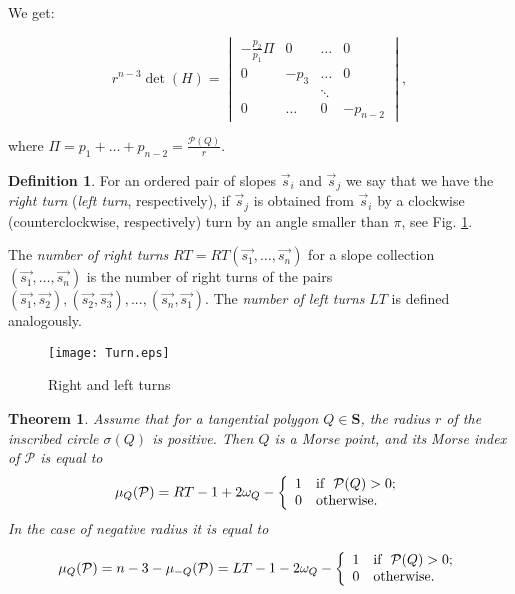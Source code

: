 \documentclass[12pt]{amsart}
\theoremstyle{plain}
\newtheorem{theorem}{Theorem}
\theoremstyle{definition}
\newtheorem{definition}{Definition}
\theoremstyle{remark}
\theoremstyle{plain}
\theoremstyle{definition}
\begin{document}
We get:

\begin{equation}\label{det}
r^{n-3}\det(H)=
\begin{vmatrix}
-\frac{p_2}{p_1}\Pi & 0 & \ldots & 0 \\
0 & -p_3 & \ldots & 0 \\
& & \ddots \\
0 & \ldots & 0 & -p_{n-2}
\end{vmatrix},
\end{equation}

where \(\Pi=p_1+\ldots+p_{n-2}=\frac{\mathcal{P}(Q)}r\).

\begin{definition}
  For an ordered pair of  slopes $\vec{s}_i$ and $\vec{s}_j$ we say that we have the \textit{right turn}  (\textit{left turn}, respectively), if $\vec{s}_j$ is obtained from $\vec{s}_i$  by a clockwise (counterclockwise, respectively)  turn by an angle smaller than $\pi$, see Fig. \ref{FigTurn}.

  The\textit{ number of right turns} \(RT=RT(\vec{s_1},\ldots,\vec{s_n})\) for a slope collection $(\vec{s_1},\ldots,\vec{s_n})$ is
the number of right turns of the pairs $(\vec{s_1},\vec{s_2}),(\vec{s_2},\vec{s_3}),...,(\vec{s_{n}},\vec{s_1}) . $
The\textit{ number of left turns} \(LT\) is defined analogously.
\end{definition}




\begin{figure}[h]
\centering \texttt{[image: Turn.eps]}
\caption{Right and left turns}\label{FigTurn}
\end{figure}


\begin{theorem}\label{ThmMorseTangential}
Assume that for a tangential polygon $Q\in \mathbf{S}$,  the radius \(r\) of the inscribed circle $\sigma(Q)$ is positive.
{Then $Q$ is a Morse point, and its Morse index of $\mathcal{P}$ is equal to}
\begin{equation}\label{index}
\mu_Q(\mathcal{P})= RT-1+2\omega_Q-\left\{
       \begin{array}{ll}
    1    &\hbox{if }\   \mathcal{P}(Q)>0; \\
        0 & \hbox{otherwise}.
       \end{array}
     \right.
\end{equation}
In the case of negative radius it is equal to

\[
\mu_Q(\mathcal{P})=n-3-\mu_{-Q}(\mathcal{P})=LT-1-2\omega_Q-\left\{
       \begin{array}{ll}
    1    &\hbox{if }\   \mathcal{P}(Q)>0; \\
        0 & \hbox{otherwise}.
       \end{array}
     \right.
\]
\end{theorem}
\end{document}
